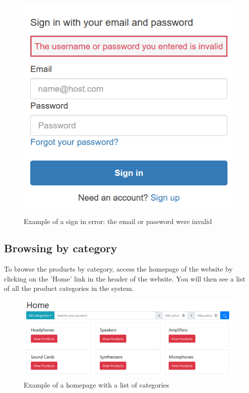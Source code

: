 \begin{figure}[H]
\centering
\includegraphics[scale=0.6]{res/Immagini/SigninError}
\caption{Example of a sign in error: the email or password were invalid}
\end{figure}

\subsection{Browsing by category}
To browse the products by category, access the homepage of the website by clicking on the 'Home' link in the header of the website. You will then see a list of all the product categories in the system.

\begin{figure}[H]
\centering
\includegraphics[scale=0.6]{res/Immagini/CategoryList}
\caption{Example of a homepage with a list of categories}
\end{figure}

